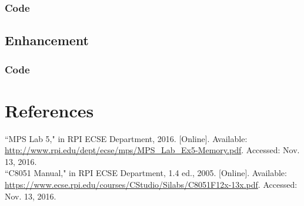 \documentclass[12pt]{article}
\begin{document}
\subsubsection{Code}
	
\subsection{Enhancement}
\subsubsection{Code}
	

\section{References} 
\noindent
``MPS Lab 5," in RPI ECSE Department, 2016. [Online]. Available: \url{http://www.rpi.edu/dept/ecse/mps/MPS_Lab_Ex5-Memory.pdf}. Accessed: Nov. 13, 2016.\\
\newline\noindent
``C8051 Manual," in RPI ECSE Department, 1.4 ed., 2005. [Online]. Available: \url{https://www.ecse.rpi.edu/courses/CStudio/Silabs/C8051F12x-13x.pdf}. Accessed: Nov. 13, 2016.
\end{document}
